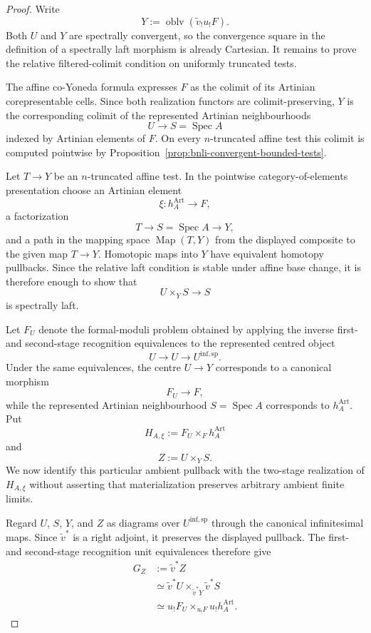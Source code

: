 \begin{proof}
Write
\[
    Y:=
    \operatorname{oblv}(\widetilde v_!u_!F).
\]
Both $U$ and $Y$ are spectrally convergent, so the convergence square in the
definition of a spectrally laft morphism is already Cartesian.  It remains to
prove the relative filtered-colimit condition on uniformly truncated tests.

The affine co-Yoneda formula expresses $F$ as the colimit of its Artinian
corepresentable cells.  Since both realization functors are
colimit-preserving, $Y$ is the corresponding colimit of the represented
Artinian neighbourhoods
\[
    U\longrightarrow S=\operatorname{Spec}A
\]
indexed by Artinian elements of $F$.  On every $n$-truncated affine test this
colimit is computed pointwise by
Proposition~\ref{prop:bnli-convergent-bounded-tests}.

Let $T\to Y$ be an $n$-truncated affine test.  In the pointwise
category-of-elements presentation choose an Artinian element
\[
    \xi:h_A^{\mathrm{Art}}\longrightarrow F,
\]
a factorization
\[
    T\longrightarrow S=\operatorname{Spec}A\longrightarrow Y,
\]
and a path in the mapping space $\operatorname{Map}(T,Y)$ from the displayed
composite to the given map $T\to Y$.  Homotopic maps into $Y$ have equivalent
homotopy pullbacks.  Since the relative laft condition is stable under affine
base change, it is therefore enough to show that
\[
\boxed{
    U\times_YS\longrightarrow S}
\]
is spectrally laft.

Let $F_U$ denote the formal-moduli problem obtained by applying the inverse
first- and second-stage recognition equivalences to the represented centred
object
\[
    U\longrightarrow U\longrightarrow U^{\mathrm{inf,sp}}.
\]
Under the same equivalences, the centre $U\to Y$ corresponds to a canonical
morphism
\[
    F_U\longrightarrow F,
\]
while the represented Artinian neighbourhood $S=\operatorname{Spec}A$
corresponds to $h_A^{\mathrm{Art}}$.  Put
\[
\boxed{
    H_{A,\xi}
    :=
    F_U\times_Fh_A^{\mathrm{Art}}}
\]
and
\[
    Z:=U\times_YS.
\]
We now identify this particular ambient pullback with the two-stage
realization of $H_{A,\xi}$ without asserting that materialization preserves
arbitrary ambient finite limits.

Regard $U$, $S$, $Y$, and $Z$ as diagrams over $U^{\mathrm{inf,sp}}$ through
the canonical infinitesimal maps.  Since $\widetilde v^*$ is a right adjoint,
it preserves the displayed pullback.  The first- and second-stage recognition
unit equivalences therefore give
\[
\begin{aligned}
    G_Z
    &:=\widetilde v^*Z\\
    &\simeq
    \widetilde v^*U
    \times_{\widetilde v^*Y}
    \widetilde v^*S\\
    &\simeq
    u_!F_U
    \times_{u_!F}
    u_!h_A^{\mathrm{Art}}.
\end{aligned}
\]


\end{proof}
